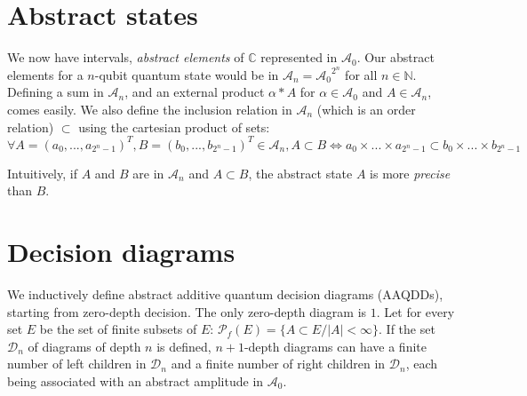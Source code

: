 \section{Abstract states}

We now have intervals, \textit{abstract elements} of $\mathbb{C}$ represented in $\mathcal{A}_0$. Our abstract elements for a $n$-qubit quantum state would be in $\mathcal{A}_n = {\mathcal{A}_0}^{2^n}$ for all $n \in \mathbb{N}$. Defining a sum in $\mathcal{A}_n$, and an external product $\alpha * A$ for
$\alpha \in \mathcal{A}_0$ and $A \in \mathcal{A}_n$, comes easily. We also define the inclusion relation in $\mathcal{A}_n$ (which is an order relation) $\subset$ using the cartesian product of sets:
$$\forall A = (a_0, ..., a_{2^n-1})^{T},  B = (b_0, ..., b_{2^n-1})^{T} \in \mathcal{A}_n, A \subset B \iff a_0 \times ... \times a_{2^n-1} \subset b_0 \times ... \times b_{2^n-1}$$

Intuitively, if $A$ and $B$ are in $\mathcal{A}_n$ and $A \subset B$, the abstract state $A$ is more \textit{precise} than $B$.

\section{Decision diagrams}

We inductively define abstract additive quantum decision diagrams (AAQDDs), starting from zero-depth decision. The only zero-depth diagram is $\boxed{1}$. Let for every set $E$ be the set of finite subsets of $E$: $\mathscr{P}_f(E) = \{ A \subset E / |A| < \infty \}$. If the set $\mathcal{D}_n$ of diagrams of depth $n$ is defined, $n+1$-depth diagrams can have a finite number of left children in $\mathcal{D}_n$ and a finite number of right children in $\mathcal{D}_n$, each being associated with an abstract amplitude in $\mathcal{A}_0$.

\begin{center}
\end{center}

